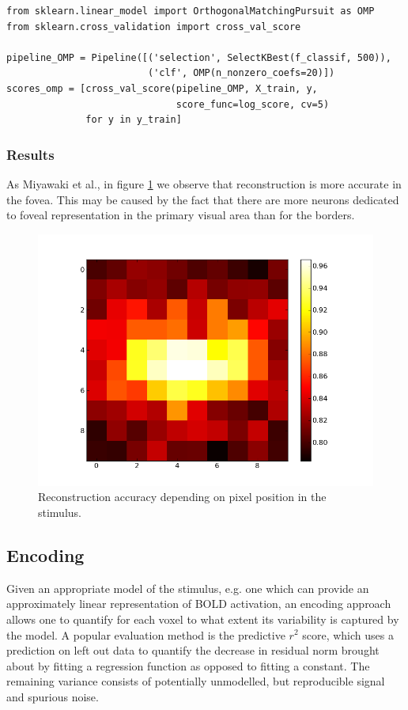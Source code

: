 \documentclass{frontiersSCNS} %
\begin{document}
\begin{lstlisting}
from sklearn.linear_model import OrthogonalMatchingPursuit as OMP
from sklearn.cross_validation import cross_val_score

pipeline_OMP = Pipeline([('selection', SelectKBest(f_classif, 500)),
                         ('clf', OMP(n_nonzero_coefs=20)])
scores_omp = [cross_val_score(pipeline_OMP, X_train, y,
                              score_func=log_score, cv=5)
              for y in y_train]
\end{lstlisting}

\subsubsection{Results}

As Miyawaki et al., in figure \ref{fig:omp} we observe that reconstruction
is more accurate in the fovea. This
may be caused by the fact that there are more neurons dedicated to foveal
representation in the primary visual area than for the borders.

\begin{figure}[hbtp]
  \begin{center}
    \includegraphics[width=.3\linewidth]{img/logistic_l1_scores.png}
  \end{center}
  \caption{Reconstruction accuracy depending on pixel
           position in the stimulus.}
\label{fig:omp}
\end{figure}

\subsection{Encoding}
Given an appropriate model of the stimulus, e.g. one which can provide an approximately linear representation of BOLD activation, an encoding approach allows one to quantify for each voxel to what extent its variability is captured by the model. A popular evaluation method is the predictive \(r^2\) score, which uses a prediction on left out data to quantify the decrease in residual norm brought about by fitting a regression function as opposed to fitting a constant. %
The remaining variance consists of potentially unmodelled, but reproducible signal and spurious noise.
\end{document}
